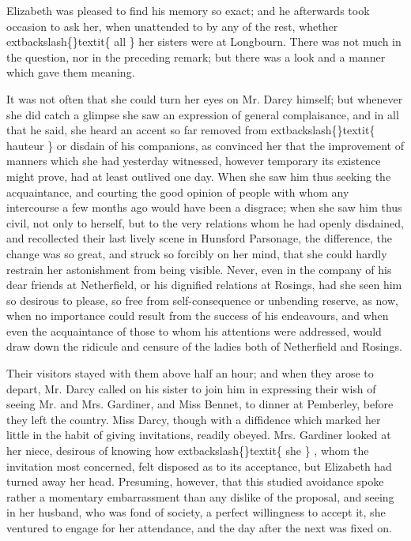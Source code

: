 \documentclass[10pt]{book}
\begin{document}
   Elizabeth was pleased to find his memory so exact; and he afterwards
took occasion to ask her, when unattended to by any of the rest, whether
   	extbackslash\{\}textit\{
    all
   \}
   her sisters were at Longbourn. There was not much in the question,
nor in the preceding remark; but there was a look and a manner which
gave them meaning.
  

   It was not often that she could turn her eyes on Mr. Darcy himself; but
whenever she did catch a glimpse she saw an expression of general
complaisance, and in all that he said, she heard an accent so far
removed from
   	extbackslash\{\}textit\{
    hauteur
   \}
   or disdain of his companions, as convinced her
that the improvement of manners which she had yesterday witnessed,
however temporary its existence might prove, had at least outlived one
day. When she saw him thus seeking the acquaintance, and courting the
good opinion of people with whom any intercourse a few months ago would
have been a disgrace; when she saw
   him thus civil, not only to herself,
but to the very relations whom he had openly disdained, and recollected
their last lively scene in Hunsford Parsonage, the difference, the
change was so great, and struck so forcibly on her mind, that she could
hardly restrain her astonishment from being visible. Never, even in the
company of his dear friends at Netherfield, or his dignified relations
at Rosings, had she seen him so desirous to please, so free from
self-consequence or unbending reserve, as now, when no importance could
result from the success of his endeavours, and when even the
acquaintance of those to whom his attentions were addressed, would draw
down the ridicule and censure of the ladies both of Netherfield and
Rosings.
  

   Their visitors stayed with them above half an hour; and when they arose
to depart, Mr. Darcy called on his sister to join him in expressing
their wish of seeing Mr. and Mrs. Gardiner, and Miss Bennet, to dinner
at Pemberley, before they left the country. Miss Darcy, though with a
diffidence which marked her little in the habit of giving invitations,
readily obeyed. Mrs. Gardiner looked at her niece, desirous of knowing
how
   	extbackslash\{\}textit\{
    she
   \}
   , whom the invitation most concerned, felt disposed as to its
acceptance, but Elizabeth had turned away her head. Presuming, however,
that this studied avoidance spoke rather a momentary embarrassment than
any dislike of the proposal, and seeing in her husband, who was fond of
society, a perfect willingness to accept it, she ventured to engage for
her attendance, and the day after the next was fixed on.
  
\end{document}
